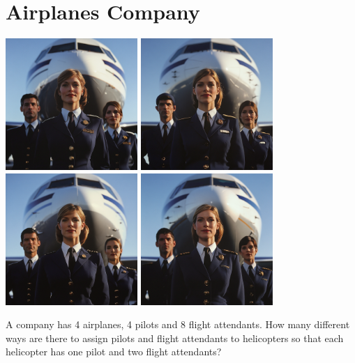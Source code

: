 \documentclass[]{article}
\begin{document}
	\section{Airplanes Company}
	\begin{center}
		\includegraphics[width=5cm]{pilot_and_two_stewards_in_front_of_a_plane0.png}
		\includegraphics[width=5cm]{pilot_and_two_stewards_in_front_of_a_plane1.png}\\
		\vspace{0.8mm}
		\includegraphics[width=5cm]{pilot_and_two_stewards_in_front_of_a_plane2.png}
		\includegraphics[width=5cm]{pilot_and_two_stewards_in_front_of_a_plane3.png}
	\end{center}
	A company has 4 airplanes, 4 pilots and 8 flight attendants.
	How many different ways are there to assign pilots and flight attendants to helicopters so that each helicopter has one pilot and two flight attendants?
	
\end{document}
